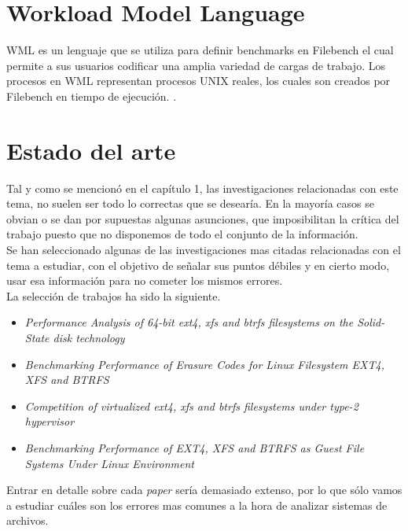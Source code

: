 \section{Workload Model Language}
WML es un lenguaje que se utiliza para definir benchmarks en Filebench el cual permite a sus usuarios codificar una amplia variedad de cargas de trabajo. Los procesos  en WML representan procesos UNIX reales, los cuales son creados por Filebench en tiempo de ejecución. \cite{Tarasov2016FilebenchAF}. 


\section{Estado del arte} \label{estado}
Tal y como se mencionó en el capítulo 1, las investigaciones relacionadas con este tema, no suelen ser todo lo correctas que se desearía. En la mayoría casos se obvian o se dan por supuestas algunas asunciones, que imposibilitan la crítica del trabajo puesto que no disponemos de todo el conjunto de la información. \\

Se han seleccionado algunas de las investigaciones mas citadas relacionadas con el tema a estudiar, con el objetivo de señalar sus puntos débiles y en cierto modo, usar esa información para no cometer los mismos errores. 
\\

La selección de trabajos ha sido la siguiente.
\begin{itemize}
    \item \textit{Performance Analysis of 64-bit ext4, xfs and btrfs filesystems on the Solid-State disk technology} \cite{Kljaji2016PerformanceAO}
    
    \item \textit{Benchmarking Performance of Erasure Codes for Linux Filesystem EXT4, XFS and BTRFS} \cite{10.1007/978-981-15-6584-7_32}
    
    \item \textit{Competition of virtualized ext4, xfs and btrfs filesystems under type-2 hypervisor} \cite{competitionvirtualized}
    
    \item \textit{Benchmarking Performance of EXT4, XFS and BTRFS as Guest File Systems Under Linux Environment} \cite{serbios}
\end{itemize}

Entrar en detalle sobre cada \textit{paper} sería demasiado extenso, por lo que sólo vamos a estudiar cuáles son los errores mas comunes a la hora de analizar sistemas de archivos.\\


